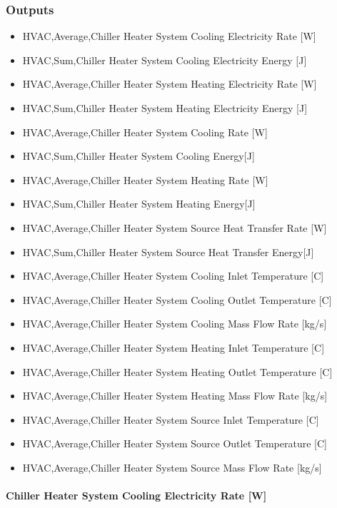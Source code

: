 \subsubsection{Outputs}\label{outputs-17-000}

\begin{itemize}
\item
  HVAC,Average,Chiller Heater System Cooling Electricity Rate {[}W{]}
\item
  HVAC,Sum,Chiller Heater System Cooling Electricity Energy {[}J{]}
\item
  HVAC,Average,Chiller Heater System Heating Electricity Rate {[}W{]}
\item
  HVAC,Sum,Chiller Heater System Heating Electricity Energy {[}J{]}
\item
  HVAC,Average,Chiller Heater System Cooling Rate {[}W{]}
\item
  HVAC,Sum,Chiller Heater System Cooling Energy{[}J{]}
\item
  HVAC,Average,Chiller Heater System Heating Rate {[}W{]}
\item
  HVAC,Sum,Chiller Heater System Heating Energy{[}J{]}
\item
  HVAC,Average,Chiller Heater System Source Heat Transfer Rate {[}W{]}
\item
  HVAC,Sum,Chiller Heater System Source Heat Transfer Energy{[}J{]}
\item
  HVAC,Average,Chiller Heater System Cooling Inlet Temperature {[}C{]}
\item
  HVAC,Average,Chiller Heater System Cooling Outlet Temperature {[}C{]}
\item
  HVAC,Average,Chiller Heater System Cooling Mass Flow Rate {[}kg/s{]}
\item
  HVAC,Average,Chiller Heater System Heating Inlet Temperature {[}C{]}
\item
  HVAC,Average,Chiller Heater System Heating Outlet Temperature {[}C{]}
\item
  HVAC,Average,Chiller Heater System Heating Mass Flow Rate {[}kg/s{]}
\item
  HVAC,Average,Chiller Heater System Source Inlet Temperature {[}C{]}
\item
  HVAC,Average,Chiller Heater System Source Outlet Temperature {[}C{]}
\item
  HVAC,Average,Chiller Heater System Source Mass Flow Rate {[}kg/s{]}
\end{itemize}

\paragraph{Chiller Heater System Cooling Electricity Rate {[}W{]}}\label{chiller-heater-system-cooling-electric-power-w}

